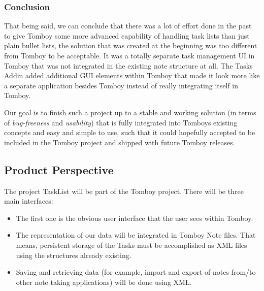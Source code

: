 \subsubsection{Conclusion}
\label{integration}
That being said, we can conclude that there was a lot of effort done in the past to give Tomboy some more advanced capability of handling task lists than just plain bullet lists, the solution that was created at the beginning was too different from Tomboy to be acceptable. It was a totally separate task management UI in Tomboy that was not integrated in the existing note structure at all. The Tasks Addin added additional GUI elements within Tomboy that made it look more like a separate application besides Tomboy instead of really integrating itself in Tomboy.

Our goal is to finish such a project up to a stable and working solution (in terms of \textit{bug-freeness} and \textit{usability}) that is fully integrated into Tomboys existing concepts and easy and simple to use, such that it could hopefully accepted to be included in the Tomboy project and  shipped with future Tomboy releases.

\subsection{Product Perspective}
\label{description:perspective}
  The project TaskList will be part of the Tomboy project. There will be three main interfaces:

  \begin{itemize}
    \item The first one is the obvious user interface that the user sees within Tomboy.
    \item The representation of our data will be integrated in Tomboy Note files. That means, persistent storage of the Tasks must be accomplished as XML files using the structures already existing.
    \item Saving and retrieving data (for example, import and export of notes from/to other note taking applications) will be done using XML.
  \end{itemize}

